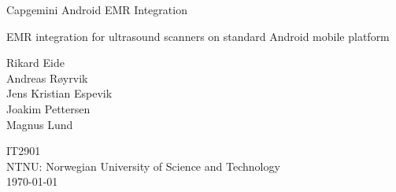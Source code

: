 \begin{titlepage}
    \begin{center}
        \vspace*{1cm}
        
        \huge{Capgemini Android EMR Integration}
        
        \vspace{1cm}
        \normalsize
        EMR integration for ultrasound scanners on standard Android mobile platform
        
        \vspace{1.5cm}
        
        \normalsize
        {Rikard Eide\\Andreas Røyrvik\\Jens Kristian Espevik\\Joakim Pettersen\\Magnus Lund}
        
        \vfill
        
        
        \vspace{0.8cm}
        
        IT2901\\
        NTNU: Norwegian University of Science and Technology\\
        \today
        
    \end{center}
\end{titlepage}